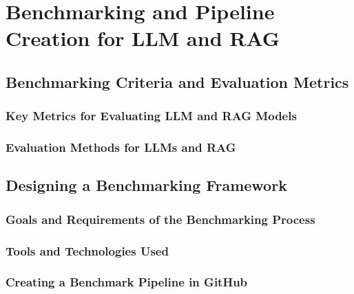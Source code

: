 \chapter{Benchmarking and Pipeline Creation for LLM and RAG}

\section{Benchmarking Criteria and Evaluation Metrics}

    \subsection{Key Metrics for Evaluating LLM and RAG Models}
    \subsection{Evaluation Methods for LLMs and RAG}

\section{Designing a Benchmarking Framework}

    \subsection{Goals and Requirements of the Benchmarking Process}
    \subsection{Tools and Technologies Used}
    \subsection{Creating a Benchmark Pipeline in GitHub}